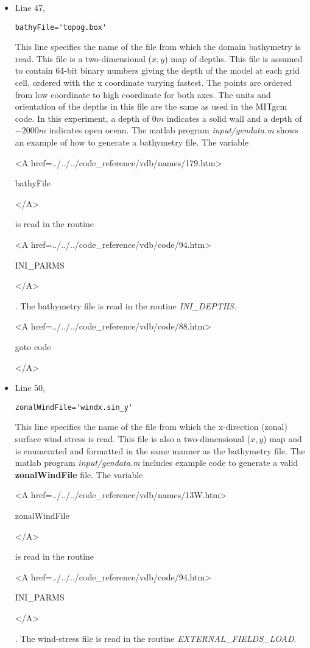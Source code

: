 \begin{itemize}
\item Line 47,
\begin{verbatim}
bathyFile='topog.box'
\end{verbatim}
This line specifies the name of the file from which the domain
bathymetry is read. This file is a two-dimensional ($x,y$) map of
depths. This file is assumed to contain 64-bit binary numbers 
giving the depth of the model at each grid cell, ordered with the x 
coordinate varying fastest. The points are ordered from low coordinate
to high coordinate for both axes. The units and orientation of the
depths in this file are the same as used in the MITgcm code. In this
experiment, a depth of $0m$ indicates a solid wall and a depth
of $-2000m$ indicates open ocean. The matlab program
{\it input/gendata.m} shows an example of how to generate a
bathymetry file.
The variable
{\bf
\begin{rawhtml} <A href=../../../code_reference/vdb/names/179.htm> \end{rawhtml}
bathyFile
\begin{rawhtml} </A>\end{rawhtml}
}
is read in the routine
{\it
\begin{rawhtml} <A href=../../../code_reference/vdb/code/94.htm> \end{rawhtml}
INI\_PARMS
\begin{rawhtml} </A>\end{rawhtml}
}. The bathymetry file is read in the routine {\it INI\_DEPTHS}.

{\bf
\begin{rawhtml} <A href=../../../code_reference/vdb/code/88.htm> \end{rawhtml}
goto code
\begin{rawhtml} </A>\end{rawhtml}
}


\item Line 50,
\begin{verbatim}
zonalWindFile='windx.sin_y'
\end{verbatim}
This line specifies the name of the file from which the x-direction
(zonal) surface wind stress is read. This file is also a two-dimensional
($x,y$) map and is enumerated and formatted in the same manner as the 
bathymetry file. The matlab program {\it input/gendata.m} includes example 
code to generate a valid 
{\bf zonalWindFile} 
file.  
The variable
{\bf
\begin{rawhtml} <A href=../../../code_reference/vdb/names/13W.htm> \end{rawhtml}
zonalWindFile
\begin{rawhtml} </A>\end{rawhtml}
}
is read in the routine
{\it
\begin{rawhtml} <A href=../../../code_reference/vdb/code/94.htm> \end{rawhtml}
INI\_PARMS
\begin{rawhtml} </A>\end{rawhtml}
}.  The wind-stress file is read in the routine 
{\it EXTERNAL\_FIELDS\_LOAD}.


\end{itemize}

